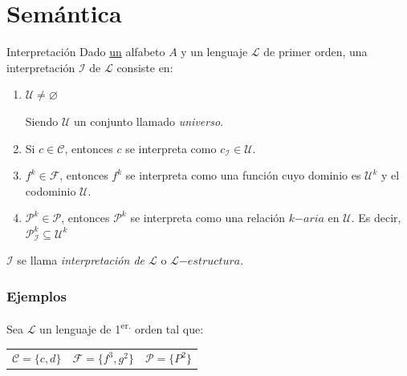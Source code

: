 \section{Semántica}

\begin{definicion}{Interpretación}{}
    Dado \underline{un} alfabeto $A$ y un lenguaje $\mathcal{L}$ de primer
    orden, una interpretación $\mathcal{I}$ de $\mathcal{L}$ consiste en:

    \begin{enumerate}
        \item $\mathcal{U} \neq \varnothing$

            Siendo $\mathcal{U}$ un conjunto llamado \textit{universo}.

        \item Si $c \in \mathcal{C}$, entonces $c$ se interpreta como 
            $c_{\mathcal{I}} \in \mathcal{U}$.

        \item $f^{k} \in \mathcal{F}$, entonces $f^{k}$ se interpreta como una
            función cuyo dominio es $\mathcal{U}^{k}$ y el codominio
            $\mathcal{U}$. 
    
        \item $\mathcal{P}^k \in \mathcal{P}$, entonces $\mathcal{P}^k$ se
            interpreta como una relación $k\mathrm{-}aria$ en $\mathcal{U}$.
            Es decir, $\mathcal{P}_\mathcal{I}^{k} \subseteq \mathcal{U}^k$
    \end{enumerate}

    \medskip

    $\mathcal{I}$ se llama \textit{interpretación de $\mathcal{L}$} o
   $\mathcal{L}\mathrm{-}estructura$.
\end{definicion}

\subsubsection{Ejemplos}

Sea $\mathcal{L}$ un lenguaje de 1\textsuperscript{er.} orden tal que:

\begin{center}
    \begin{tabular}{c c c}
        $\mathcal{C} = \{ c,d \}$ & $\mathcal{F} = \{ f^3 , g^2 \}$
        & $\mathcal{P} = \{ P^2 \}$
    \end{tabular}
\end{center}

